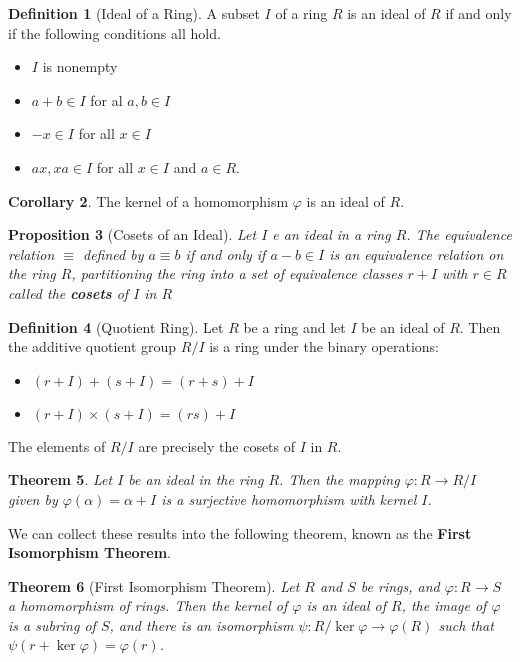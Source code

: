 \documentclass[10pt, oneside, reqno]{amsart}
\theoremstyle{plain}%
\newtheorem{thm}{Theorem}[section]
\newtheorem{prop}[thm]{Proposition}
\theoremstyle{definition}
\newtheorem{defn}[thm]{Definition}
\newtheorem{cor}[thm]{Corollary}
\theoremstyle{remark}
\newcommand{\al}{\alpha}
\begin{document}
\begin{defn}[Ideal of a Ring]
    A subset $I$ of a ring $R$ is an ideal of $R$ if and only if the following conditions all hold.
    \begin{itemize}
        \item $I$ is nonempty
        \item $a + b \in I$ for al $a, b \in I$
        \item $-x \in I$ for all $x \in I$
        \item $ax, xa \in I$ for all $x \in I$ and $a \in R$.
    \end{itemize}
\end{defn}

\begin{cor}
    The kernel of a homomorphism $\varphi$ is an ideal of $R$.
\end{cor}

\begin{prop}[Cosets of an Ideal]
    Let $I$ e an ideal in a ring $R$.  The equivalence relation $\equiv$ defined by $a \equiv b$ if and only if $a - b \in I$ is an equivalence relation on the ring $R$, partitioning the ring into a set of equivalence classes $r + I$ with $r \in R$ called the \textbf{cosets} of $I$ in $R$
\end{prop}

\begin{defn}[Quotient Ring]
    Let $R$ be a ring and let $I$ be an ideal of $R$.  Then the additive quotient group $R / I$ is a ring under the binary operations:
    \begin{itemize}
        \item $(r + I) + (s+I) = (r+s) + I$
        \item $(r + I) \times (s + I) = (rs) + I$
    \end{itemize}
    
    The elements of $R/I$ are precisely the cosets of $I$ in $R$.
\end{defn}

\begin{thm}
    Let $I$ be an ideal in the ring $R$.  Then the mapping $\varphi: R \rightarrow R/I$ given by $\varphi(\alpha) = \al + I$ is a surjective homomorphism with kernel $I$.
\end{thm}

We can collect these results into the following theorem, known as the \textbf{First Isomorphism Theorem}.

\begin{thm}[First Isomorphism Theorem]
    Let $R$ and $S$ be rings, and $\varphi: R \rightarrow S$ a homomorphism of rings.  Then the kernel of $\varphi$ is an ideal of $R$, the image of $\varphi$ is a subring of $S$, and there is an isomorphism $\psi: R / \ker \varphi \rightarrow \varphi(R)$ such that $\psi(r + \ker \varphi) = \varphi(r)$. 
\end{thm}
\end{document}

